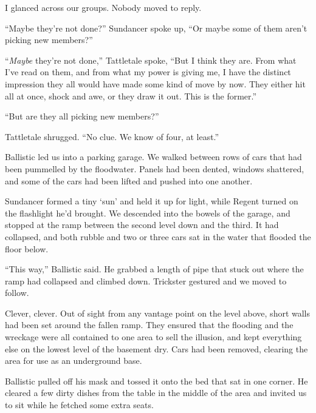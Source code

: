 I glanced across our groups.  Nobody moved to reply.



``Maybe they're not done?'' Sundancer spoke up, ``Or maybe some of them aren't picking new members?''



``\emph{Maybe} they're not done,'' Tattletale spoke, ``But I think they are.  From what I've read on them, and from what my power is giving me, I have the distinct impression they all would have made some kind of move by now.  They either hit all at once, shock and awe, or they draw it out.  This is the former.''



``But are they all picking new members?''



Tattletale shrugged.  ``No clue.  We know of four, at least.''



Ballistic led us into a parking garage.  We walked between rows of cars that had been pummelled by the floodwater.  Panels had been dented, windows shattered, and some of the cars had been lifted and pushed into one another.



Sundancer formed a tiny `sun' and held it up for light, while Regent turned on the flashlight he'd brought.  We descended into the bowels of the garage, and stopped at the ramp between the second level down and the third.  It had collapsed, and both rubble and two or three cars sat in the water that flooded the floor below.



``This way,'' Ballistic said.  He grabbed a length of pipe that stuck out where the ramp had collapsed and climbed down.  Trickster gestured and we moved to follow.



Clever, clever.  Out of sight from any vantage point on the level above, short walls had been set around the fallen ramp.  They ensured that the flooding and the wreckage were all contained to one area to sell the illusion, and kept everything else on the lowest level of the basement dry.  Cars had been removed, clearing the area for use as an underground base.



Ballistic pulled off his mask and tossed it onto the bed that sat in one corner.  He cleared a few dirty dishes from the table in the middle of the area and invited us to sit while he fetched some extra seats.



